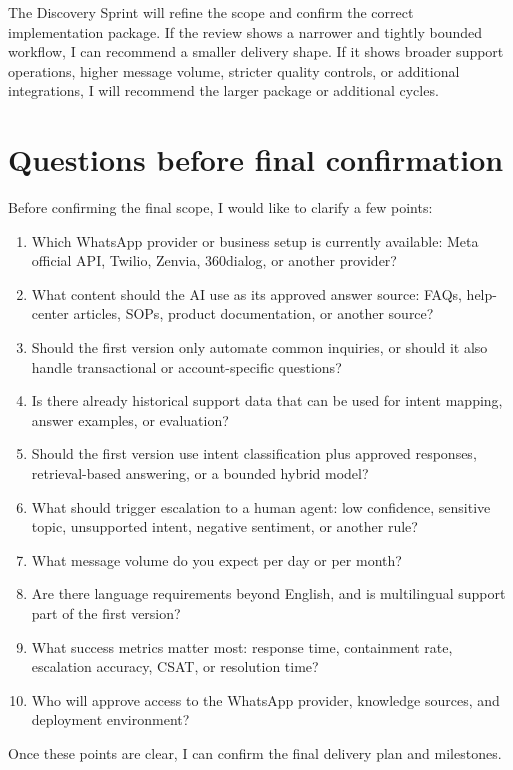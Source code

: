 \documentclass[11pt,a4paper]{article}
\begin{document}
The Discovery Sprint will refine the scope and confirm the correct implementation package. If the review shows a narrower and tightly bounded workflow, I can recommend a smaller delivery shape. If it shows broader support operations, higher message volume, stricter quality controls, or additional integrations, I will recommend the larger package or additional cycles.\par

\section*{Questions before final confirmation}

Before confirming the final scope, I would like to clarify a few points:\par

\begin{enumerate}
\item Which WhatsApp provider or business setup is currently available: Meta official API, Twilio, Zenvia, 360dialog, or another provider?
\item What content should the AI use as its approved answer source: FAQs, help-center articles, SOPs, product documentation, or another source?
\item Should the first version only automate common inquiries, or should it also handle transactional or account-specific questions?
\item Is there already historical support data that can be used for intent mapping, answer examples, or evaluation?
\item Should the first version use intent classification plus approved responses, retrieval-based answering, or a bounded hybrid model?
\item What should trigger escalation to a human agent: low confidence, sensitive topic, unsupported intent, negative sentiment, or another rule?
\item What message volume do you expect per day or per month?
\item Are there language requirements beyond English, and is multilingual support part of the first version?
\item What success metrics matter most: response time, containment rate, escalation accuracy, CSAT, or resolution time?
\item Who will approve access to the WhatsApp provider, knowledge sources, and deployment environment?
\end{enumerate}

Once these points are clear, I can confirm the final delivery plan and milestones.\par
\end{document}

